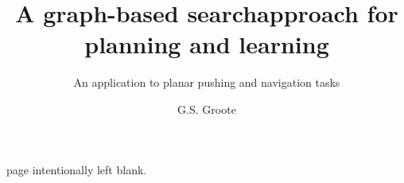 \documentclass{layout/tudelft-report}
\begin{document}
\frontmatter

\title{A graph-based search\newline approach for planning and learning}

\subtitle{An application to planar pushing and navigation tasks} 

\author{G.S. Groote}
\subject{SC52045: System \& Control Thesis Report}

%
\makecover
page intentionally left blank.
\newpage




\tableofcontents
\listoffigures
\listoftables

\printunsrtglossary[type=symbols,style=long]

\mainmatter


% 
% 
% 
% 

%


\setcounter{biburlnumpenalty}{7000}
\setcounter{biburllcpenalty}{7000}
\setcounter{biburlucpenalty}{7000}

\printbibliography[heading=bibintoc,title=References]


\end{document}
